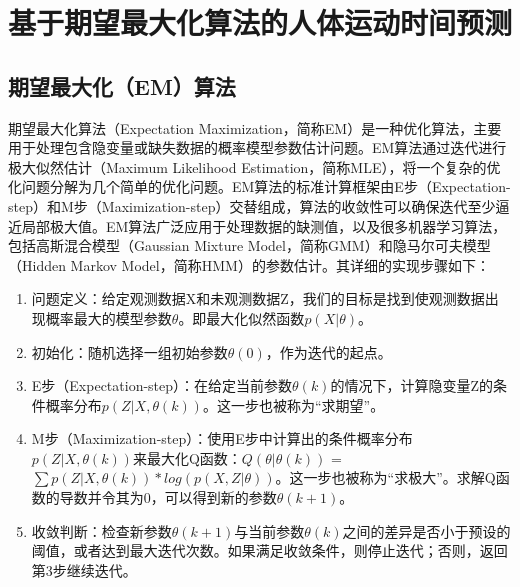 \section{基于期望最大化算法的人体运动时间预测}
\subsection{期望最大化（EM）算法}
期望最大化算法（Expectation Maximization，简称EM）是一种优化算法，主要用于处理包含隐变量或缺失数据的概率模型参数估计问题。EM算法通过迭代进行极大似然估计（Maximum Likelihood Estimation，简称MLE），将一个复杂的优化问题分解为几个简单的优化问题。EM算法的标准计算框架由E步（Expectation-step）和M步（Maximization-step）交替组成，算法的收敛性可以确保迭代至少逼近局部极大值。EM算法广泛应用于处理数据的缺测值，以及很多机器学习算法，包括高斯混合模型（Gaussian Mixture Model，简称GMM）和隐马尔可夫模型（Hidden Markov Model，简称HMM）的参数估计。其详细的实现步骤如下：

\begin{enumerate}
\item 问题定义：给定观测数据X和未观测数据Z，我们的目标是找到使观测数据出现概率最大的模型参数$θ$。即最大化似然函数$p(X|θ)$。

\item 初始化：随机选择一组初始参数$θ(0)$，作为迭代的起点。

\item E步（Expectation-step）：在给定当前参数$θ(k)$的情况下，计算隐变量Z的条件概率分布$p(Z|X, θ(k))$。这一步也被称为“求期望”。

\item M步（Maximization-step）：使用E步中计算出的条件概率分布$p(Z|X, θ(k))$来最大化Q函数：$Q(θ|θ(k))$ = $\sum p(Z|X, θ(k)) * log(p(X, Z|θ))$。这一步也被称为``求极大''。求解Q函数的导数并令其为0，可以得到新的参数$θ(k+1)$。

\item 收敛判断：检查新参数$θ(k+1)$与当前参数$θ(k)$之间的差异是否小于预设的阈值，或者达到最大迭代次数。如果满足收敛条件，则停止迭代；否则，返回第3步继续迭代。
\end{enumerate}

